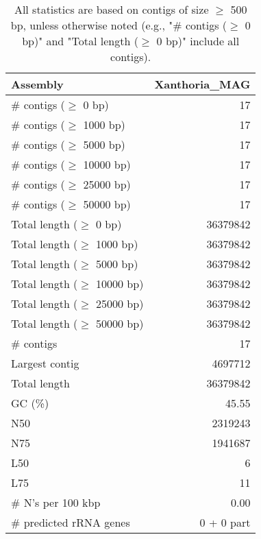 \documentclass[12pt,a4paper]{article}
\begin{document}
\begin{table}[ht]
\begin{center}
\caption{All statistics are based on contigs of size $\geq$ 500 bp, unless otherwise noted (e.g., "\# contigs ($\geq$ 0 bp)" and "Total length ($\geq$ 0 bp)" include all contigs).}
\begin{tabular}{|l*{1}{|r}|}
\hline
Assembly & Xanthoria\_MAG \\ \hline
\# contigs ($\geq$ 0 bp) & 17 \\ \hline
\# contigs ($\geq$ 1000 bp) & 17 \\ \hline
\# contigs ($\geq$ 5000 bp) & 17 \\ \hline
\# contigs ($\geq$ 10000 bp) & 17 \\ \hline
\# contigs ($\geq$ 25000 bp) & 17 \\ \hline
\# contigs ($\geq$ 50000 bp) & 17 \\ \hline
Total length ($\geq$ 0 bp) & 36379842 \\ \hline
Total length ($\geq$ 1000 bp) & 36379842 \\ \hline
Total length ($\geq$ 5000 bp) & 36379842 \\ \hline
Total length ($\geq$ 10000 bp) & 36379842 \\ \hline
Total length ($\geq$ 25000 bp) & 36379842 \\ \hline
Total length ($\geq$ 50000 bp) & 36379842 \\ \hline
\# contigs & 17 \\ \hline
Largest contig & 4697712 \\ \hline
Total length & 36379842 \\ \hline
GC (\%) & 45.55 \\ \hline
N50 & 2319243 \\ \hline
N75 & 1941687 \\ \hline
L50 & 6 \\ \hline
L75 & 11 \\ \hline
\# N's per 100 kbp & 0.00 \\ \hline
\# predicted rRNA genes & 0 + 0 part \\ \hline
\end{tabular}
\end{center}
\end{table}
\end{document}

